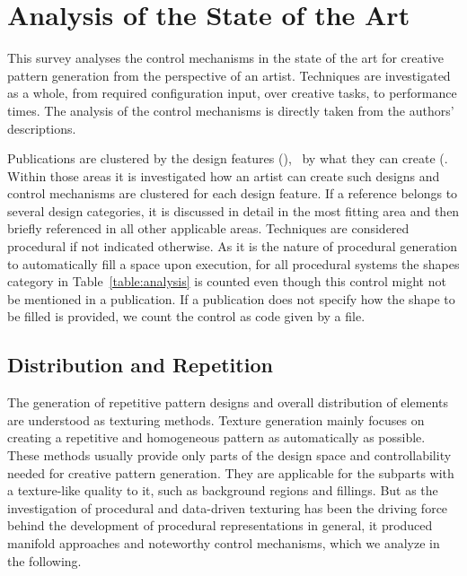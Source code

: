 

\section{Analysis of the State of the Art}
\label{sec:analysis}

This survey analyses the control mechanisms in the state of the art for creative pattern generation from the perspective of an artist. Techniques are investigated as a whole, from required configuration input, over creative tasks, to performance times. The analysis of the control mechanisms is directly taken from the authors' descriptions. 

Publications are clustered by the design features (), \ie~by what they can create (. Within those areas it is investigated how an artist can create such designs and control mechanisms are clustered for each design feature. If a reference belongs to several design categories, it is discussed in detail in the most fitting area and then briefly referenced in all other applicable areas. Techniques are considered procedural if not indicated otherwise. As it is the nature of procedural generation to automatically fill a space upon execution, for all procedural systems the shapes category in Table~\ref{table:analysis} is counted even though this control might not be mentioned in a publication. 
If a publication does not specify how the shape to be filled is provided, we count the control as code given by a file.

\subsection{Distribution and Repetition}
\label{subsec:analysis_distribution_and_repetition}

The generation of repetitive pattern designs and overall distribution of elements are understood as texturing methods. Texture generation mainly focuses on creating a repetitive and homogeneous pattern as automatically as possible. These methods usually provide only parts of the design space and controllability needed for creative pattern generation. They are applicable for the subparts with a texture-like quality to it, such as background regions and fillings. But as the investigation of procedural and data-driven texturing has been the driving force behind the development of procedural representations in general, it produced manifold approaches and noteworthy control mechanisms, which we analyze in the following.


